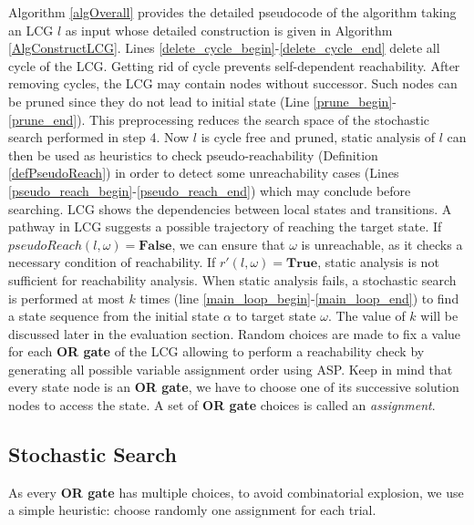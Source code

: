 \documentclass{entcs}
\begin{document}
Algorithm \ref{algOverall} provides the detailed pseudocode of the algorithm taking an LCG $l$ as input whose detailed construction is given in Algorithm \ref{AlgConstructLCG}.
Lines \ref{delete_cycle_begin}-\ref{delete_cycle_end} delete all cycle of the LCG.
Getting rid of cycle prevents self-dependent reachability.
After removing cycles, the LCG may contain nodes without successor.
Such nodes can be pruned since they do not lead to initial state (Line \ref{prune_begin}-\ref{prune_end}).
This preprocessing reduces the search space of the stochastic search performed in step 4.
Now $l$ is cycle free and pruned, static analysis of $l$ can then be used as heuristics to check pseudo-reachability (Definition \ref{defPseudoReach}) in order to detect some unreachability cases (Lines \ref{pseudo_reach_begin}-\ref{pseudo_reach_end}) which may conclude before searching.
LCG shows the dependencies between local states and transitions. 
A pathway in LCG suggests a possible trajectory of reaching the target state. 
If $pseudoReach(l,\omega)=\textbf{False}$, we can ensure that $\omega$ is unreachable, as it checks a necessary condition of reachability.
If $r'(l,\omega)=\textbf{True}$, static analysis is not sufficient for reachability analysis. 
When static analysis fails, a stochastic search is performed at most $k$ times (line \ref{main_loop_begin}-\ref{main_loop_end}) to find a state sequence from the initial state $\alpha$ to target state $\omega$.
The value of $k$ will be discussed later in the evaluation section.
Random choices are made to fix a value for each \textbf{OR gate} of the LCG allowing to perform a reachability check by generating all possible variable assignment order using ASP.
Keep in mind that every state node is an \textbf{OR gate}, we have to choose one of its successive solution nodes to access the state. 
A set of \textbf{OR gate} choices is called an \textit{assignment}.

\subsection{Stochastic Search}\label{sec:OR}
As every \textbf{OR gate} has multiple choices, to avoid combinatorial explosion, we use a simple heuristic: 
choose randomly one assignment for each trial.
\end{document}
